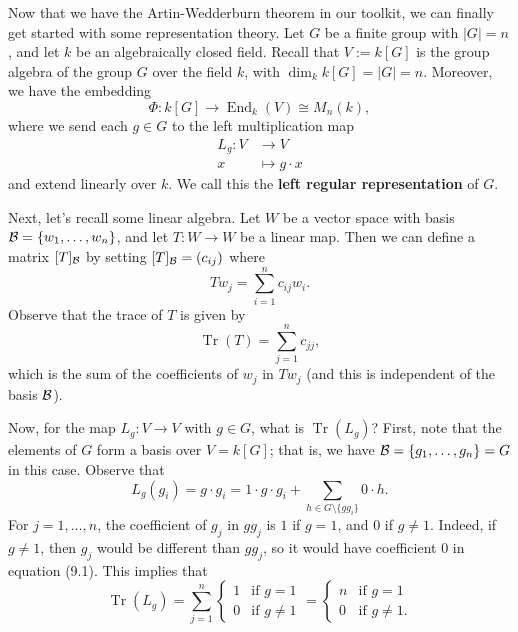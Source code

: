 \documentclass[10pt]{article}
\numberwithin{equation}{section}
\DeclareMathOperator{\End}{End}
\DeclareMathOperator{\Tr}{Tr}
\theoremstyle{newstyle}
\begin{document}
Now that we have the Artin-Wedderburn theorem in our toolkit, we can finally get started with 
some representation theory. Let $G$ be a finite group with $|G| = n$, and let $k$ 
be an algebraically closed field. Recall that $V := k[G]$ is the group algebra of the group $G$ over 
the field $k$, with $\dim_k k[G] = |G| = n$. Moreover, we have the embedding 
\[ \Phi : k[G] \to \End_k(V) \cong M_n(k), \]
where we send each $g \in G$ to the left multiplication map 
\begin{align*}
    L_g : V &\to V \\ x &\mapsto g \cdot x
\end{align*}
and extend linearly over $k$. We call this the {\bf left regular representation} of $G$. 

Next, let's recall some linear algebra. Let $W$ be a vector space with basis ${\cal B} 
= \{w_1, \dots, w_n\}$, and let $T : W \to W$ be a linear map. Then we can define a matrix 
$[T]_{\cal B}$ by setting $[T]_{\cal B} = (c_{ij})$ where 
\[ Tw_j = \sum_{i=1}^n c_{ij} w_i. \] 
Observe that the trace of $T$ is given by 
\[ \Tr(T) = \sum_{j=1}^n c_{jj}, \]
which is the sum of the coefficients of $w_j$ in $Tw_j$ (and this is independent of the basis 
${\cal B}$). 

Now, for the map $L_g : V \to V$ with $g \in G$, what is $\Tr(L_g)$? First, note that the elements of 
$G$ form a basis over $V = k[G]$; that is, we have ${\cal B} = \{g_1, \dots, g_n\} = G$ in this case. 
Observe that 
\begin{equation} L_g(g_i) = g \cdot g_i = 1 \cdot g \cdot g_i + \sum_{h \in G \setminus \{gg_i\}} 0 \cdot h. \end{equation}
For $j = 1, \dots, n$, the coefficient of $g_j$ in $gg_j$ is $1$ if $g = 1$, and $0$ if 
$g \neq 1$. Indeed, if $g \neq 1$, then $g_j$ would be different than $gg_j$, so it would have 
coefficient $0$ in equation (9.1). This implies that 
\[ \Tr(L_g) = \sum_{j=1}^n \begin{cases} 1 & \text{if } g = 1 \\ 0 & \text{if } g \neq 1 \end{cases} 
= \begin{cases} n & \text{if } g = 1 \\ 0 & \text{if } g \neq 1. \end{cases} \]
\end{document}
